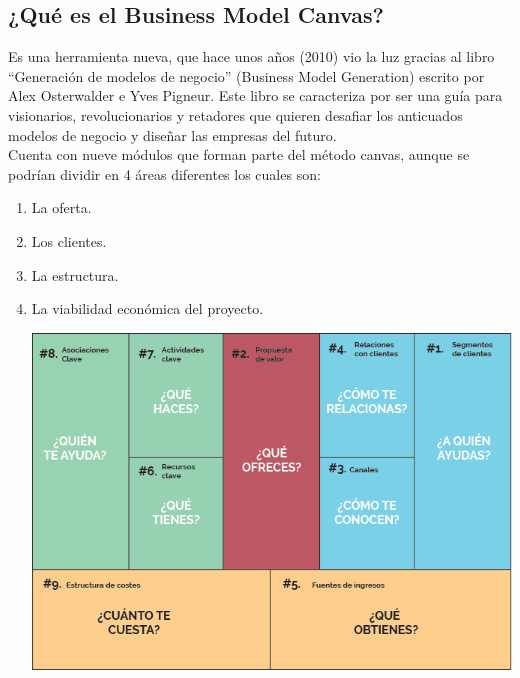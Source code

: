 \documentclass[preprint,12pt]{elsarticle}
\begin{document}
\subsection{¿Qué es el Business Model Canvas?}	
Es una herramienta nueva, que hace unos años (2010) vio la luz gracias al libro  “Generación de modelos de negocio” (Business Model Generation) escrito por Alex Osterwalder e Yves Pigneur. Este libro se caracteriza por ser una guía para visionarios, revolucionarios y retadores que quieren desafiar los anticuados modelos de negocio y diseñar las empresas del futuro. \\
Cuenta con nueve módulos que forman parte del método canvas, aunque se podrían dividir en 4 áreas diferentes los cuales son:\\
\begin{enumerate}[1.]
\item La oferta.
\item Los clientes.
\item La estructura.
\item La viabilidad económica del proyecto.

	\begin{center}
	\includegraphics[width=13cm]{./Imagenes/canvas}
	\end{center}

\end{enumerate}
\pagebreak
\end{document}
